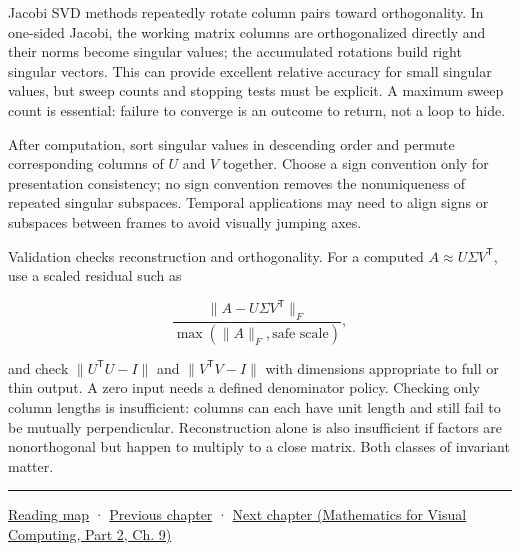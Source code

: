 Jacobi SVD methods repeatedly rotate column pairs toward orthogonality. In one-sided Jacobi, the working matrix columns are orthogonalized directly and their norms become singular values; the accumulated rotations build right singular vectors. This can provide excellent relative accuracy for small singular values, but sweep counts and stopping tests must be explicit. A maximum sweep count is essential: failure to converge is an outcome to return, not a loop to hide.

After computation, sort singular values in descending order and permute corresponding columns of \(U\) and \(V\) together. Choose a sign convention only for presentation consistency; no sign convention removes the nonuniqueness of repeated singular subspaces. Temporal applications may need to align signs or subspaces between frames to avoid visually jumping axes.

Validation checks reconstruction and orthogonality. For a computed \(A\approx U\Sigma V^\mathsf T\), use a scaled residual such as

\[
\frac{\|A-U\Sigma V^\mathsf T\|_F}
{\max(\|A\|_F,\text{safe scale})},
\]

and check \(\|U^\mathsf TU-I\|\) and \(\|V^\mathsf TV-I\|\) with dimensions appropriate to full or thin output. A zero input needs a defined denominator policy. Checking only column lengths is insufficient: columns can each have unit length and still fail to be mutually perpendicular. Reconstruction alone is also insufficient if factors are nonorthogonal but happen to multiply to a close matrix. Both classes of invariant matter.

\begin{center}\rule{0.5\linewidth}{0.5pt}\end{center}

\hyperref[volume-reading-map]{Reading map} · \hyperref[02-foundations-ii-ch023-probability-models-and-measurement-error]{Previous chapter} · \href{../02-Mathematics-for-Visual-Computing-P02/main.pdf\#nameddest=02-foundations-ii-ch025-continuous-models-and-numerical-error}{Next chapter (Mathematics for Visual Computing, Part 2, Ch. 9)}

